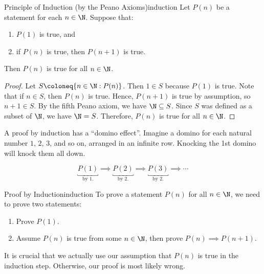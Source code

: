 \begin{thmbox}{Principle of Induction (by the Peano Axioms)}{induction}
    Let $P(n)$ be a statement for each $n \in \N$. Suppose that:
    \begin{enumerate}[noitemsep]
        \item $P(1)$ is true, and
        \item if $P(n)$ is true, then $P(n+1)$ is true.
    \end{enumerate}
    Then $P(n)$ is true for all $n \in \N$.
    \tcblower
    \begin{proof}
        Let $S \coloneq \{ n \in \N : P(n) \}$. Then $1 \in S$ because $P(1)$ is true. Note that if $n \in S$, then $P(n)$ is true. Hence, $P(n+1)$ is true by assumption, so $n+1 \in S$. By the fifth Peano axiom, we have $\N \subseteq S$. Since $S$ was defined as a subset of $\N$, we have $\N = S$. Therefore, $P(n)$ is true for all $n \in \N$.
    \end{proof}
\end{thmbox}

A proof by induction has a ``domino effect''. Imagine a domino for each natural number $1$, $2$, $3$, and so on, arranged in an infinite row. Knocking the 1st domino will knock them all down.


\[ \underbracket{P(1)}_{\text{by 1.}} \implies \underbracket{P(2)}_{\text{by 2.}} \implies \underbracket{P(3)}_{\text{by 2.}} \implies \cdots \]

\begin{tecbox}{Proof by Induction}{induction}
    To prove a statement $P(n)$ for all $n \in \N$, we need to prove two statements:
    \begin{enumerate}
        \item {} Prove $P(1)$.
        \item {} Assume $P(n)$ is true from some $n \in \N$, then prove $P(n) \implies P(n+1)$.
    \end{enumerate}
\end{tecbox}

It is crucial that we actually use our assumption that $P(n)$ is true in the induction step. Otherwise, our proof is most likely wrong.

